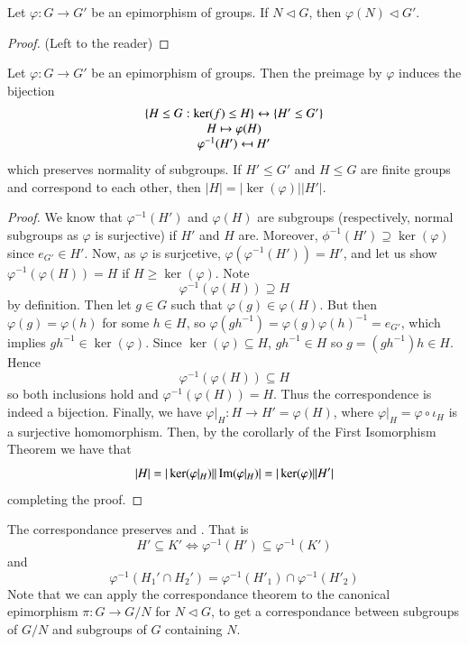 \documentclass[12pt, a4paper, oneside, openright, titlepage]{book}
\begin{document}
\begin{prop}
        Let $\varphi:G\rightarrow G'$ be an epimorphism of groups. If $N \vartriangleleft G$, then $\varphi(N) \vartriangleleft G'$.
\end{prop}
\begin{proof}
        (Left to the reader)
\end{proof}

\begin{namthm}\label{thmname:corrgroup}
        Let $\varphi:G\rightarrow G'$ be an epimorphism of groups. Then the preimage by $\varphi$ induces the bijection \begin{equation}
                        \map{\{H\leq G: \ker(f) \leq H\} \leftrightarrow \{H' \leq G'\}}{\map{H \mapsto \varphi(H)}{\varphi^{-1}(H') \mapsfrom H'}}
        \end{equation}
        which preserves normality of subgroups. If $H' \leq G'$ and $H \leq G$ are finite groups and correspond to each other, then $|H| = |\ker(\varphi)||H'|$.
\end{namthm}
\begin{proof}
        We know that $\varphi^{-1}(H')$ and $\varphi(H)$ are subgroups (respectively, normal subgroups as $\varphi$ is surjective) if $H'$ and $H$ are. Moreover, $\phi^{-1}(H') \supseteq \ker(\varphi)$ since $e_{G'} \in H'$. Now, as $\varphi$ is surjcetive, $\varphi(\varphi^{-1}(H')) = H'$, and let us show $\varphi^{-1}(\varphi(H)) = H$ if $H\geq \ker(\varphi)$. Note $$\varphi^{-1}(\varphi(H)) \supseteq H$$ by definition. Then let $g \in G$ such that $\varphi(g) \in \varphi(H)$. But then $\varphi(g) = \varphi(h)$ for some $h \in H$, so $\varphi(gh^{-1}) = \varphi(g)\varphi(h)^{-1} = e_{G'}$, which implies $gh^{-1} \in \ker(\varphi)$. Since $\ker(\varphi) \subseteq H$, $gh^{-1} \in H$ so $g = (gh^{-1})h \in H$. Hence $$\varphi^{-1}(\varphi(H)) \subseteq H$$ so both inclusions hold and $\varphi^{-1}(\varphi(H)) = H$. Thus the correspondence is indeed a bijection. Finally, we have $\varphi\rvert_{H}:H\rightarrow H' = \varphi(H)$, where $\varphi\rvert_H = \varphi \circ \iota_H$ is a surjective homomorphism. Then, by the corollarly of the First Isomorphism Theorem we have that $$|H| = |\ker(\varphi\rvert_H)||\operatorname{Im}(\varphi\rvert_H)| = |\ker(\varphi)||H'|$$ completing the proof.
\end{proof}


\begin{rmk}
        The correspondance preserves  and . That is \begin{equation}
                H'\subseteq K' \iff \varphi^{-1}(H') \subseteq \varphi^{-1}(K')
        \end{equation}
        and \begin{equation}
                \varphi^{-1}(H_1'\cap H_2') = \varphi^{-1}(H'_1) \cap \varphi^{-1}(H'_2)
        \end{equation}
        Note that we can apply the correspondance theorem to the canonical epimorphism $\pi:G\rightarrow G/N$ for $N \vartriangleleft G$, to get a correspondance between subgroups of $G/N$ and subgroups of $G$ containing $N$.
\end{rmk}
\end{document}
